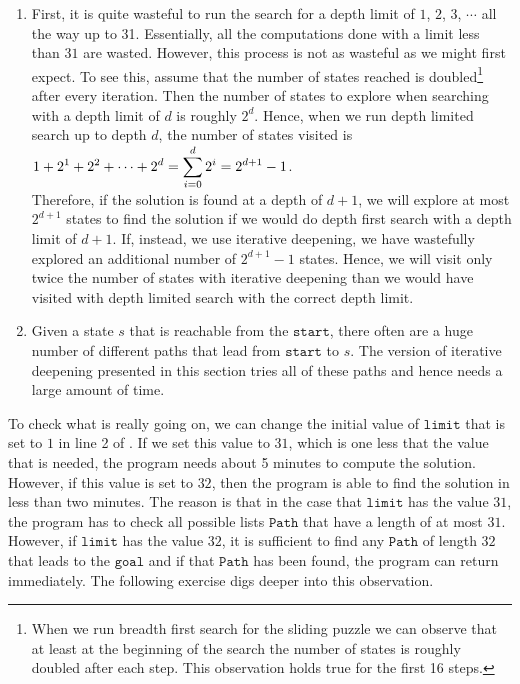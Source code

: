 \begin{enumerate}
\item First, it is quite wasteful to run the search for a depth limit of $1$, $2$, $3$, $\cdots$ all the way up
      to 31.  Essentially, all the computations done with a limit less than $31$ are wasted. However,
      this process is not as wasteful as we might first expect.  To see this, assume that the number of states
      reached is doubled\footnote{
        When we run breadth first search for the sliding puzzle we can observe that at least at the beginning
        of the search the number of states is roughly doubled after each step.  This observation holds true for
        the first 16 steps. 
      }
      after every iteration.  Then the number of states to explore when searching with a depth limit of $d$ is 
      roughly $2^d$.  Hence, when we run depth limited search up to depth $d$, the number of states visited is 
      \\[0.2cm]
      \hspace*{1.3cm}
      $\displaystyle 1 + 2^1 + 2^2 + \cdots + 2^d = \sum\limits_{i=0}^d 2^i = 2^{d+1} - 1$.
      \\[0.2cm]
      Therefore, if the solution is found at a depth of $d+1$, we will explore at most $2^{d+1}$ states to find
      the solution if we would do depth first search with a depth limit of $d+1$.  If, instead, we use
      iterative deepening, we have wastefully explored an additional number of $2^{d+1} -1$ states.  Hence, we
      will visit only twice the number of states with iterative deepening than we would have visited with depth
      limited search with the correct depth limit.
\item Given a state $s$ that is reachable from the $\texttt{start}$, there often are a huge number of
      different paths that lead from $\texttt{start}$ to $s$.  The version of iterative deepening presented in
      this section tries all of these paths and hence needs a large amount of time.
\end{enumerate}
To check what is really going on, we can change the initial value of $\texttt{limit}$ that is set to $1$ in
line 2 of .  If we set this value to $31$, which is one less that the
value that is needed, the program needs about 5 minutes to compute the solution.  However, if this value is set to
$32$, then the program is able to find the solution in less than two minutes.  The reason is that in the case that 
$\texttt{limit}$ has the value $31$, the program has to check all possible lists $\texttt{Path}$ that have a
length of at most $31$.  However, if $\texttt{limit}$ has the value $32$, it is sufficient to find any
$\texttt{Path}$ of length $32$ that leads to the $\texttt{goal}$ and if that $\texttt{Path}$ has been found, the
program can return immediately.  The following exercise digs deeper into this observation.

